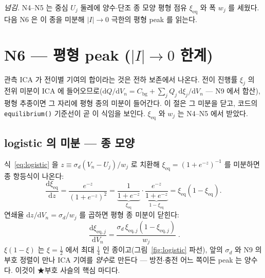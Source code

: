 \documentclass[11pt,a4paper]{article}
\newcommand{\dd}{\mathrm{d}}
\newcommand{\eq}{\mathrm{eq}}
\newcommand{\bg}{\mathrm{bg}}
\newcommand{\code}[1]{\texttt{#1}}
\begin{document}
\medskip
\emph{넘김.} N4--N5 는 중심 $U_j$ 둘레에 양수$\cdot$단조 종 모양 평형 점유 $\xi_\eq$ 와 폭 $w_j$ 를 세웠다. 다음 N6 은 이 종을 미분해 $|I|\to0$ 극한의 평형 peak 를 읽는다.

\section{N6 — 평형 peak ($|I|\to0$ 한계)}\label{sec:eqpeak}
관측 ICA 가 전이별 기여의 합이라는 것은 전하 보존에서 나온다. 전이 진행률 $\xi_j$ 의 전위 미분이 ICA 에 들어오므로($\dd Q/\dd V_n=C_\bg+\sum_j Q_j\,\dd\xi_j/\dd V_n$ — N9 에서 합산), 평형 추종이면 그 자리에 평형 종의 미분이 들어간다. 이 절은 그 미분을 닫고, 코드의 \code{equilibrium()} 기준선이 곧 이 식임을 보인다. $\xi_\eq$ 와 $w_j$ 는 N4--N5 에서 받았다.

\subsection{logistic 의 미분 — 종 모양}
식~\eqref{eq:logistic} 을 $z\equiv\sigma_d(V_n-U_j)/w_j$ 로 치환해 $\xi_\eq=(1+e^{-z})^{-1}$ 를 미분하면 종 항등식이 나온다:
\begin{equation}
\frac{\dd\xi_\eq}{\dd z}
=\frac{e^{-z}}{(1+e^{-z})^2}
=\underbrace{\frac{1}{1+e^{-z}}}_{\xi_\eq}\cdot
\underbrace{\frac{e^{-z}}{1+e^{-z}}}_{1-\xi_\eq}
=\xi_\eq(1-\xi_\eq).
\label{eq:belliden}
\end{equation}
연쇄율 $\dd z/\dd V_n=\sigma_d/w_j$ 를 곱하면 평형 종 미분이 닫힌다:
\begin{equation}
\boxed{\;\frac{\dd\xi_{\eq,j}}{\dd V_n}=\frac{\sigma_d\,\xi_{\eq,j}(1-\xi_{\eq,j})}{w_j}\;.}
\label{eq:dxidV}
\end{equation}
$\xi(1-\xi)$ 는 $\xi=\tfrac12$ 에서 최대 $\tfrac14$ 인 종이고(그림~\ref{fig:logistic} 파선), 앞의 $\sigma_d$ 와 N9 의 부호 정렬이 만나 ICA 기여를 \emph{양수}로 만든다 — 방전$\cdot$충전 어느 쪽이든 peak 는 양수다. 이것이 ★부호 사슬의 핵심 마디다.
\end{document}
